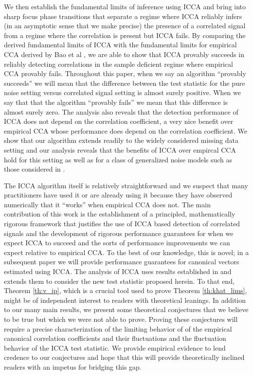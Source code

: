 We then establish the fundamental limits of inference using ICCA and bring into sharp
focus phase transitions that separate a regime where ICCA reliably infers (in an
asymptotic sense that we make precise) the presence of a correlated signal from a regime
where the correlation is present but ICCA fails. By comparing the derived fundamental
limits of ICCA with the fundamental limits for empirical CCA derived by Bao et al
\cite{bao2014canonical}, we are able to show that ICCA provably succeeds in reliably
detecting correlations in the sample deficient regime where empirical CCA provably
fails. Throughout this paper, when we say an algorithm ``provably succeeds'' we will mean
that the difference between the test statistic for the pure noise setting versus
correlated signal setting is almost surely positive. When we say that that the algorithm
``provably fails'' we mean that this difference is almost surely zero. The analysis also
reveals that the detection performance of ICCA does not depend on the correlation
coefficient, a very nice benefit over empirical CCA whose performance does depend on the
correlation coefficient. We show that our algorithm extends readily to the widely
considered missing data setting
\cite{candes2006stable,candes2009exact,cai2010singular,candes2010matrix,candes2010power}
and our analysis reveals that the benefits of ICCA over empircal CCA hold for this setting
as well as for a class of generalized noise models such as those considered in
\cite{benaych2012singular}.

The ICCA algorithm itself is relatively straightforward and we suspect that many
practitioners have used it or are already using it because they have observed numerically
that it ``works'' when empirical CCA does not. The main contribution of this work is the
establishment of a principled, mathematically rigorous framework that justifies the use of
ICCA based detection of correlated signals and the development of rigorous performance
guarantees for when we expect ICCA to succeed and the sorts of performance improvements we
can expect relative to empirical CCA. To the best of our knowledge, this is novel; in a
subsequent paper we will provide performance guarantees for canonical vectors estimated
using ICCA. The analysis of ICCA uses results established in
\cite{benaych2012singular,benaych2011eigenvalues} and extends them to consider the new
test statistic proposed herein. To that end, Theorem \ref{th:v_ip}, which is a crucial
tool used to prove Theorem \ref{th:khat_lims}, might be of independent interest to readers
with theoretical leanings. In addition to our many main results, we present some
theoretical conjectures that we believe to be true but which we were not able to
prove. Proving these conjectures will require a precise characterization of the limiting
behavior of of the empirical canonical correlation coefficients and their fluctuations and
the fluctuation behavior of the ICCA test statistic. We provide empirical evidence to lend
credence to our conjectures and hope that this will provide theoretically inclined readers
with an impetus for bridging this gap.

